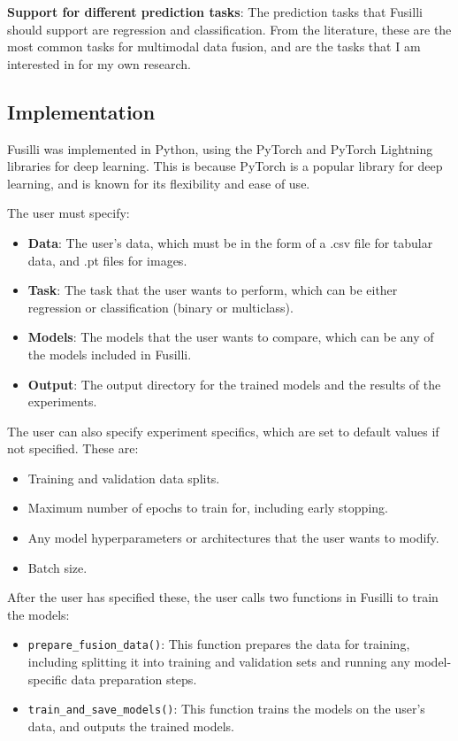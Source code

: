 \vspace{0.3cm}

\noindent\textbf{Support for different prediction tasks}: The prediction tasks that Fusilli should support are regression and classification.
From the literature, these are the most common tasks for multimodal data fusion, and are the tasks that I am interested in for my own research.


\subsection{Implementation}

Fusilli was implemented in Python, using the PyTorch and PyTorch Lightning libraries for deep learning.
This is because PyTorch is a popular library for deep learning, and is known for its flexibility and ease of use.

\noindent The user must specify:
\begin{itemize}
  \setlength\itemsep{-0.5em}
    \item \textbf{Data}: The user's data, which must be in the form of a .csv file for tabular data, and .pt files for images.
    \item \textbf{Task}: The task that the user wants to perform, which can be either regression or classification (binary or multiclass).
    \item \textbf{Models}: The models that the user wants to compare, which can be any of the models included in Fusilli.
    \item \textbf{Output}: The output directory for the trained models and the results of the experiments.
\end{itemize}

\noindent The user can also specify experiment specifics, which are set to default values if not specified.
These are:
\begin{itemize}
    \setlength\itemsep{-0.5em}
    \item Training and validation data splits.
    \item Maximum number of epochs to train for, including early stopping.
    \item Any model hyperparameters or architectures that the user wants to modify.
    \item Batch size.
\end{itemize}

\noindent After the user has specified these, the user calls two functions in Fusilli to train the models:
\begin{itemize}
\setlength\itemsep{-0.5em}
    \item \texttt{prepare\_fusion\_data()}: This function prepares the data for training, including splitting it into training and validation sets and running any model-specific data preparation steps.
    \item \texttt{train\_and\_save\_models()}: This function trains the models on the user's data, and outputs the trained models.
\end{itemize}

